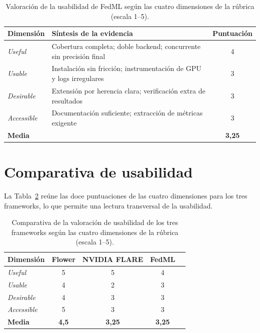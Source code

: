 \begin{table}[htbp]
  \centering
  \caption{Valoración de la usabilidad de FedML según las cuatro dimensiones de la rúbrica
  (escala 1--5).}
  \label{tab:usab-fedml}
  \begin{tabular}{llc}
    \toprule
    \textbf{Dimensión} & \textbf{Síntesis de la evidencia} & \textbf{Puntuación} \\
    \midrule
    \textit{Useful}     & Cobertura completa; doble backend; concurrente sin precisión final & 4 \\
    \textit{Usable}     & Instalación sin fricción; instrumentación de GPU y logs irregulares & 3 \\
    \textit{Desirable}  & Extensión por herencia clara; verificación extra de resultados     & 3 \\
    \textit{Accessible} & Documentación suficiente; extracción de métricas exigente          & 3 \\
    \midrule
    \textbf{Media}      &                                                                    & \textbf{3{,}25} \\
    \bottomrule
  \end{tabular}
\end{table}

\section{Comparativa de usabilidad}\label{sec:usab-comparativa}

La Tabla~\ref{tab:usab-comparativa} reúne las doce puntuaciones de las cuatro dimensiones
para los tres frameworks, lo que permite una lectura transversal de la usabilidad.

\begin{table}[htbp]
  \centering
  \caption{Comparativa de la valoración de usabilidad de los tres frameworks según las
  cuatro dimensiones de la rúbrica (escala 1--5).}
  \label{tab:usab-comparativa}
  \begin{tabular}{lcccc}
    \toprule
    \textbf{Dimensión} & \textbf{Flower} & \textbf{NVIDIA FLARE} & \textbf{FedML} \\
    \midrule
    \textit{Useful}     & 5 & 5 & 4 \\
    \textit{Usable}     & 4 & 2 & 3 \\
    \textit{Desirable}  & 4 & 3 & 3 \\
    \textit{Accessible} & 5 & 3 & 3 \\
    \midrule
    \textbf{Media}      & \textbf{4{,}5} & \textbf{3{,}25} & \textbf{3{,}25} \\
    \bottomrule
  \end{tabular}
\end{table}

